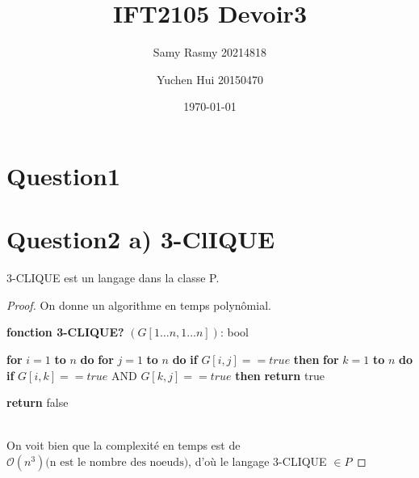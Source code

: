 \documentclass{article}
\title{\textbf{IFT2105 Devoir3}}
\author{
    Samy Rasmy 20214818 \and Yuchen Hui 20150470}
\date{\today}
\theoremstyle{definition}
\theoremstyle{remark}
\begin{document}
\maketitle

\section*{Question1}
\section*{Question2 a) 3-ClIQUE}
3-CLIQUE est un langage dans la classe P.
\begin{proof}
	On donne un algorithme en temps polynômial.\\
	    \begin{algorithm} 
		\caption{\textbf{fonction 3-CLIQUE?} $(G\left[ 1\ldots n,1\ldots n \right] )$: bool}
		\label{3-clique} 
		\begin{algorithmic}
		\STATE {} 
		\STATE \textbf{for} $i = 1$ \textbf{ to } $n$ \textbf{ do}	
		\STATE \qquad\textbf{for} $j = 1$ \textbf{ to } $n$ \textbf{ do}	
		\STATE \qquad\qquad \textbf{if} $G\left[ i,j \right] == true $ \textbf{then}
		\STATE \qquad\qquad\qquad \textbf{for} $k = 1$ \textbf{ to } $n$ \textbf{ do}
		\STATE \qquad\qquad\qquad\qquad \textbf{if} $G\left[ i,k \right]  == true \text{ AND } G\left[ k,j \right] == true $ \textbf{then}
		\STATE \qquad\qquad\qquad\qquad\qquad \textbf{return} true 

		\STATE \textbf{return} false
		\end{algorithmic} 
	    \end{algorithm}\\
	    On voit bien que la complexité en temps est de $\mathcal{O} \left ( n^{3} \right ) \text{(n est le nombre des noeuds)}$, d'où le langage 3-CLIQUE $\in P$
 
\end{proof}
\end{document}
